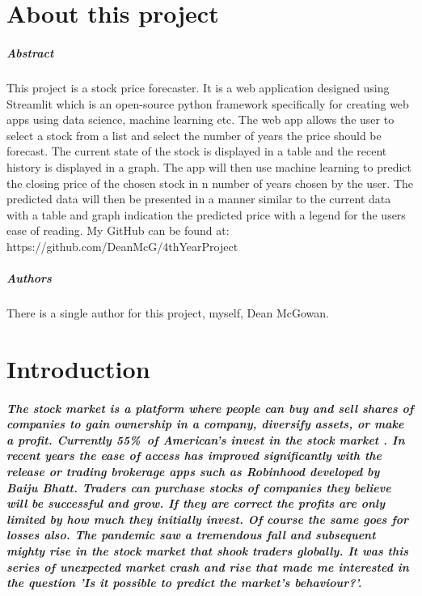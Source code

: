 
\chapter*{About this project}

\paragraph{Abstract}
This project is a stock price forecaster. It is a web application designed using Streamlit which is an open-source python framework specifically for creating web apps using data science, machine learning etc. The web app allows the user to select a stock from a list and select the number of years the price should be forecast. The current state of the stock is displayed in a table and the recent history is displayed in a graph. The app will then use machine learning to predict the closing price of the chosen stock in n number of years chosen by the user. The predicted data will then be presented in a manner similar to the current data with a table and graph indication the predicted price with a legend for the users ease of reading.
My GitHub can be found at: https://github.com/DeanMcG/4thYearProject

\paragraph{Authors}
There is a single author for this project, myself, Dean McGowan.

\chapter{Introduction}

\paragraph{The stock market is a platform where people can buy and sell shares of companies to gain ownership in a company, diversify assets, or make a profit. Currently 55\%\ of American's invest in the stock market \cite{statista}. In recent years the ease of access has improved significantly with the release or trading brokerage apps such as Robinhood developed by Baiju Bhatt. Traders can purchase stocks of companies they believe will be successful and grow. If they are correct the profits are only limited by how much they initially invest. Of course the same goes for losses also. The pandemic saw a tremendous fall and subsequent mighty rise in the stock market that shook traders globally. It was this series of unexpected market crash and rise that made me interested in the question 'Is it possible to predict the market's behaviour?'.}


